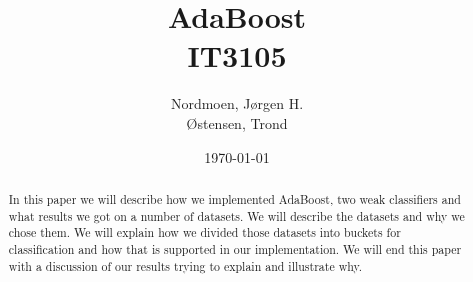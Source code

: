 \documentclass[titlepage, a4paper]{article}
\title{
	AdaBoost \\
	IT3105 \\
}
\author{
	Nordmoen, Jørgen H. \\
	Østensen, Trond
}
\date{\today}
\begin{document}
\maketitle

\begin{abstract}\label{abstract}
	In this paper we will describe how we implemented AdaBoost, two weak classifiers
	and what results we got on a number of datasets. We will describe the datasets
	and why we chose them. We will explain how we divided those datasets into buckets
	for classification and how that is supported in our implementation. We will end
	this paper with a discussion of our results trying to explain and illustrate why.
\end{abstract}

\newpage
\tableofcontents
\listoffigures

\clearpage
{}
\end{document}

